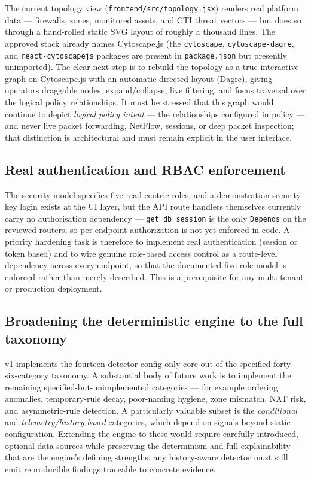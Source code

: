 The current topology view (\texttt{frontend/src/topology.jsx}) renders real platform data --- firewalls, zones, monitored assets, and CTI threat vectors --- but does so through a hand-rolled static SVG layout of roughly a thousand lines. The approved stack already names Cytoscape.js (the \texttt{cytoscape}, \texttt{cytoscape-dagre}, and \texttt{react-cytoscapejs} packages are present in \texttt{package.json} but presently unimported). The clear next step is to rebuild the topology as a true interactive graph on Cytoscape.js with an automatic directed layout (Dagre), giving operators draggable nodes, expand/collapse, live filtering, and focus traversal over the logical policy relationships. It must be stressed that this graph would continue to depict \emph{logical policy intent} --- the relationships configured in policy --- and never live packet forwarding, NetFlow, sessions, or deep packet inspection; that distinction is architectural and must remain explicit in the user interface.

\subsection{Real authentication and RBAC enforcement}
\label{sec:ch5-rbac}

The security model specifies five read-centric roles, and a demonstration security-key login exists at the UI layer, but the API route handlers themselves currently carry no authorisation dependency --- \texttt{get\_db\_session} is the only \texttt{Depends} on the reviewed routers, so per-endpoint authorization is not yet enforced in code. A priority hardening task is therefore to implement real authentication (session or token based) and to wire genuine role-based access control as a route-level dependency across every endpoint, so that the documented five-role model is enforced rather than merely described. This is a prerequisite for any multi-tenant or production deployment.

\subsection{Broadening the deterministic engine to the full taxonomy}
\label{sec:ch5-taxonomy}

v1 implements the fourteen-detector config-only core out of the specified forty-six-category taxonomy. A substantial body of future work is to implement the remaining specified-but-unimplemented categories --- for example ordering anomalies, temporary-rule decay, poor-naming hygiene, zone mismatch, NAT risk, and asymmetric-rule detection. A particularly valuable subset is the \emph{conditional} and \emph{telemetry/history-based} categories, which depend on signals beyond static configuration. Extending the engine to these would require carefully introduced, optional data sources while preserving the determinism and full explainability that are the engine's defining strengths: any history-aware detector must still emit reproducible findings traceable to concrete evidence.

